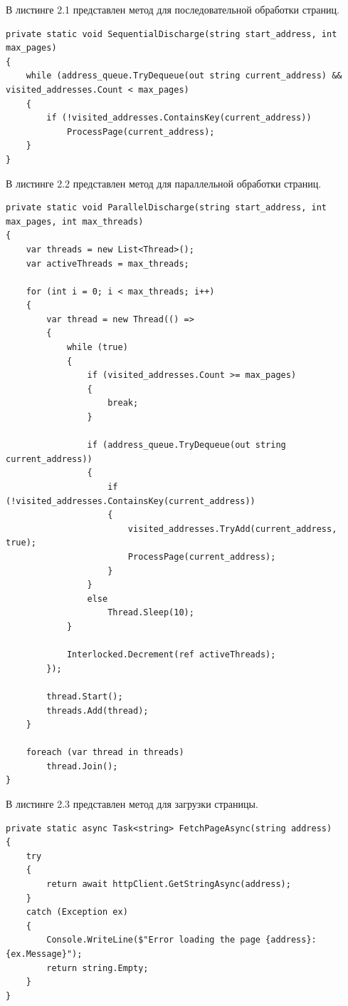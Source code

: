 В листинге 2.1 представлен метод для последовательной обработки страниц.

\begin{lstlisting}[caption={Метод SequentialDischarge для последовательной обработки страниц}]
private static void SequentialDischarge(string start_address, int max_pages)
{
    while (address_queue.TryDequeue(out string current_address) && visited_addresses.Count < max_pages)
    {
        if (!visited_addresses.ContainsKey(current_address))
            ProcessPage(current_address);
    }
}
\end{lstlisting}

В листинге 2.2 представлен метод для параллельной обработки страниц.

\begin{lstlisting}[caption={Метод ParallelDischarge для параллельной обработки страниц}]
private static void ParallelDischarge(string start_address, int max_pages, int max_threads)
{
    var threads = new List<Thread>();
    var activeThreads = max_threads; 

    for (int i = 0; i < max_threads; i++)
    {
        var thread = new Thread(() =>
        {
            while (true)
            {
                if (visited_addresses.Count >= max_pages)
                {
                    break;
                }

                if (address_queue.TryDequeue(out string current_address))
                {
                    if (!visited_addresses.ContainsKey(current_address))
                    {
                        visited_addresses.TryAdd(current_address, true);
                        ProcessPage(current_address);
                    }
                }
                else
                    Thread.Sleep(10); 
            }

            Interlocked.Decrement(ref activeThreads); 
        });

        thread.Start();
        threads.Add(thread);
    }

    foreach (var thread in threads)
        thread.Join();
}
\end{lstlisting}

В листинге 2.3 представлен метод для загрузки страницы.

\begin{lstlisting}[caption={Метод FetchPageAsync для загрузки страницы}]
private static async Task<string> FetchPageAsync(string address)
{
    try
    {
        return await httpClient.GetStringAsync(address);
    }
    catch (Exception ex)
    {
        Console.WriteLine($"Error loading the page {address}: {ex.Message}");
        return string.Empty;
    }
}
\end{lstlisting}

